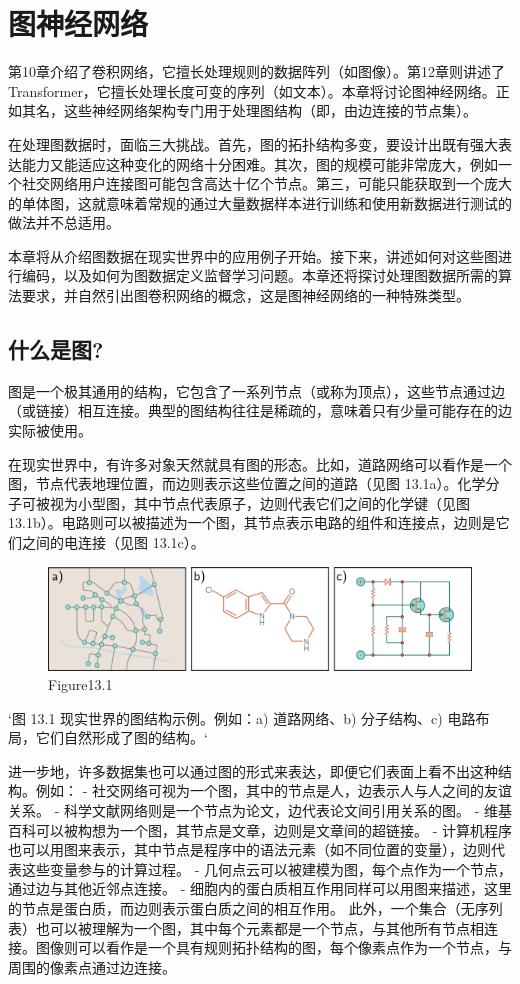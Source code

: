 \chapter{图神经网络}

第10章介绍了卷积网络，它擅长处理规则的数据阵列（如图像）。第12章则讲述了 Transformer，它擅长处理长度可变的序列（如文本）。本章将讨论图神经网络。正如其名，这些神经网络架构专门用于处理图结构（即，由边连接的节点集）。

在处理图数据时，面临三大挑战。首先，图的拓扑结构多变，要设计出既有强大表达能力又能适应这种变化的网络十分困难。其次，图的规模可能非常庞大，例如一个社交网络用户连接图可能包含高达十亿个节点。第三，可能只能获取到一个庞大的单体图，这就意味着常规的通过大量数据样本进行训练和使用新数据进行测试的做法并不总适用。

本章将从介绍图数据在现实世界中的应用例子开始。接下来，讲述如何对这些图进行编码，以及如何为图数据定义监督学习问题。本章还将探讨处理图数据所需的算法要求，并自然引出图卷积网络的概念，这是图神经网络的一种特殊类型。
\section{什么是图?}
图是一个极其通用的结构，它包含了一系列节点（或称为顶点），这些节点通过边（或链接）相互连接。典型的图结构往往是稀疏的，意味着只有少量可能存在的边实际被使用。

在现实世界中，有许多对象天然就具有图的形态。比如，道路网络可以看作是一个图，节点代表地理位置，而边则表示这些位置之间的道路（见图 13.1a）。化学分子可被视为小型图，其中节点代表原子，边则代表它们之间的化学键（见图 13.1b）。电路则可以被描述为一个图，其节点表示电路的组件和连接点，边则是它们之间的电连接（见图 13.1c）。

\begin{figure}[ht!]
\centering
\includegraphics[width=0.7\linewidth]{png/chapter13/GraphRealWorld.png}
\caption{Figure13.1}
\end{figure}

`图 13.1 现实世界的图结构示例。例如：a) 道路网络、b) 分子结构、c) 电路布局，它们自然形成了图的结构。`

进一步地，许多数据集也可以通过图的形式来表达，即便它们表面上看不出这种结构。例如：
- 社交网络可视为一个图，其中的节点是人，边表示人与人之间的友谊关系。
- 科学文献网络则是一个节点为论文，边代表论文间引用关系的图。
- 维基百科可以被构想为一个图，其节点是文章，边则是文章间的超链接。
- 计算机程序也可以用图来表示，其中节点是程序中的语法元素（如不同位置的变量），边则代表这些变量参与的计算过程。
- 几何点云可以被建模为图，每个点作为一个节点，通过边与其他近邻点连接。
- 细胞内的蛋白质相互作用同样可以用图来描述，这里的节点是蛋白质，而边则表示蛋白质之间的相互作用。
此外，一个集合（无序列表）也可以被理解为一个图，其中每个元素都是一个节点，与其他所有节点相连接。图像则可以看作是一个具有规则拓扑结构的图，每个像素点作为一个节点，与周围的像素点通过边连接。

